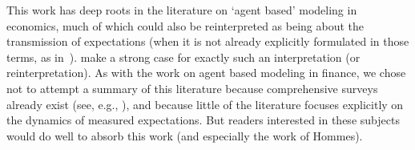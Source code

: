 This work has deep roots in the literature on `agent based' modeling in economics, much of which could also be reinterpreted as being about the transmission of expectations (when it is not already explicitly formulated in those terms, as in~\cite{hommes2006heterogeneous}).  \cite{haldane_drawing_2019} make a strong case for exactly such an interpretation (or reinterpretation).  As with the work on agent based modeling in finance, we chose not to attempt a summary of this literature because comprehensive surveys already exist (see, e.g., \cite{ddAgentBasedMacro}), and because little of the literature focuses explicitly on the dynamics of measured expectations.  But readers interested in these subjects would do well to absorb this work (and especially the work of Hommes).

